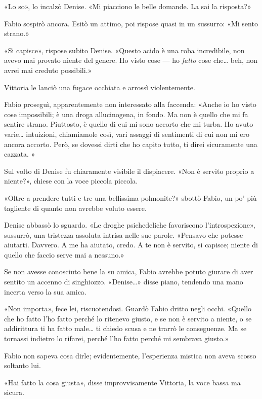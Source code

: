 «Lo so», lo incalzò Denise. «Mi piacciono le belle domande. La sai la
risposta?»

Fabio sospirò ancora. Esitò un attimo, poi rispose quasi in un sussurro:
«Mi sento strano.»

«Si capisce», rispose subito Denise. «Questo acido è una roba
incredibile, non avevo mai provato niente del genere. Ho visto cose ---
ho \emph{fatto} cose che\ldots{} beh, non avrei mai creduto possibili.»

Vittoria le lanciò una fugace occhiata e arrossì violentemente.

Fabio proseguì, apparentemente non interessato alla faccenda: «Anche io
ho visto cose impossibili; è una droga allucinogena, in fondo. Ma non è
quello che mi fa sentire strano. Piuttosto, è quello di cui mi sono
accorto che mi turba. Ho avuto varie\ldots{} intuizioni, chiamiamole
così, vari assaggi di sentimenti di cui non mi ero ancora accorto. Però,
se dovessi dirti che ho capito tutto, ti direi sicuramente una cazzata.
»

Sul volto di Denise fu chiaramente visibile il dispiacere. «Non è
servito proprio a niente?», chiese con la voce piccola piccola.

«Oltre a prendere tutti e tre una bellissima polmonite?» sbottò Fabio,
un po' più tagliente di quanto non avrebbe voluto essere.

Denise abbassò lo sguardo. «Le droghe psichedeliche favoriscono
l'introspezione», sussurrò, una tristezza assoluta intrisa nelle sue
parole. «Pensavo che potesse aiutarti. Davvero. A me ha aiutato, credo.
A te non è servito, si capisce; niente di quello che faccio serve mai a
nessuno.»

Se non avesse conosciuto bene la su amica, Fabio avrebbe potuto giurare
di aver sentito un accenno di singhiozzo. «Denise\ldots{}» disse piano,
tendendo una mano incerta verso la sua amica.

«Non importa», fece lei, riscuotendosi. Guardò Fabio dritto negli occhi.
«Quello che ho fatto l'ho fatto perché lo ritenevo giusto, e se non è
servito a niente, o se addirittura ti ha fatto male\ldots{} ti chiedo
scusa e ne trarrò le conseguenze. Ma se tornassi indietro lo rifarei,
perché l'ho fatto perché mi sembrava giusto.»

Fabio non sapeva cosa dirle; evidentemente, l'esperienza mistica non
aveva scosso soltanto lui.

«Hai fatto la cosa giusta», disse improvvisamente Vittoria, la voce
bassa ma sicura.

